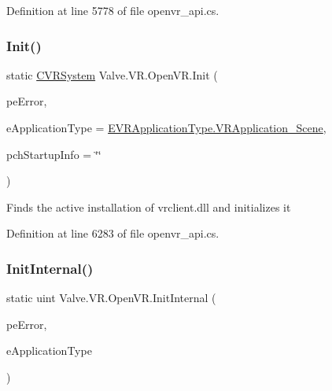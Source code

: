 Definition at line 5778 of file openvr\+\_\+api.\+cs.

\mbox{\label{class_valve_1_1_v_r_1_1_open_v_r_a9984a6ebb99fb582a11d5ada0b8af27c}} 
\subsubsection{\texorpdfstring{Init()}{Init()}}
{\footnotesize\ttfamily static \mbox{\hyperlink{class_valve_1_1_v_r_1_1_c_v_r_system}{C\+V\+R\+System}} Valve.\+V\+R.\+Open\+V\+R.\+Init (\begin{DoxyParamCaption}\item[{ref \mbox{\hyperlink{namespace_valve_1_1_v_r_a5d8a20b60549ae5b7668d73452c7e83e}{E\+V\+R\+Init\+Error}}}]{pe\+Error,  }\item[{\mbox{\hyperlink{namespace_valve_1_1_v_r_a75c95b1b332a3c064198f2eac92ffe07}{E\+V\+R\+Application\+Type}}}]{e\+Application\+Type = {\ttfamily \mbox{\hyperlink{namespace_valve_1_1_v_r_a75c95b1b332a3c064198f2eac92ffe07a112ddda5e69d20e2c68d17d672fda8b5}{E\+V\+R\+Application\+Type.\+V\+R\+Application\+\_\+\+Scene}}},  }\item[{string}]{pch\+Startup\+Info = {\ttfamily \char`\"{}\char`\"{}} }\end{DoxyParamCaption})\hspace{0.3cm}{\ttfamily [static]}}

Finds the active installation of vrclient.\+dll and initializes it 

Definition at line 6283 of file openvr\+\_\+api.\+cs.

\mbox{\label{class_valve_1_1_v_r_1_1_open_v_r_a416675ba428968a6da50f9490efce76b}} 
\subsubsection{\texorpdfstring{InitInternal()}{InitInternal()}}
{\footnotesize\ttfamily static uint Valve.\+V\+R.\+Open\+V\+R.\+Init\+Internal (\begin{DoxyParamCaption}\item[{ref \mbox{\hyperlink{namespace_valve_1_1_v_r_a5d8a20b60549ae5b7668d73452c7e83e}{E\+V\+R\+Init\+Error}}}]{pe\+Error,  }\item[{\mbox{\hyperlink{namespace_valve_1_1_v_r_a75c95b1b332a3c064198f2eac92ffe07}{E\+V\+R\+Application\+Type}}}]{e\+Application\+Type }\end{DoxyParamCaption})\hspace{0.3cm}{\ttfamily [static]}}



